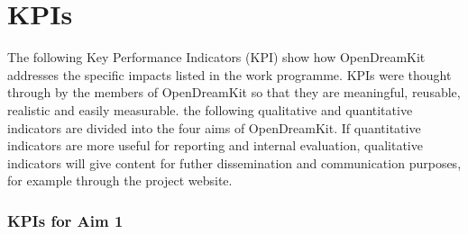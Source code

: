 
\section{KPIs}

\begin{introduction}
 The following Key Performance Indicators (KPI) show how OpenDreamKit addresses the specific impacts listed in the work programme. KPIs were 
 thought through by the members of OpenDreamKit so that they are meaningful, reusable, realistic and easily measurable. the following 
 qualitative and quantitative indicators are divided into the four aims of OpenDreamKit. If quantitative indicators are more useful for 
 reporting and internal evaluation, qualitative indicators will give content for futher dissemination and communication purposes, for 
 example through the project website.
\end{introduction}


\subsubsection{KPIs for Aim 1}

